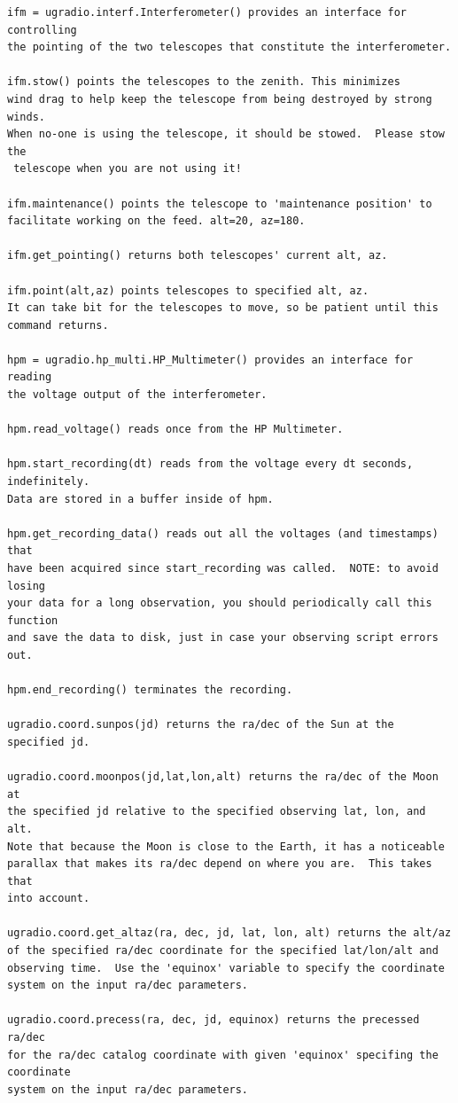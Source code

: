 \documentclass[11pt,preprint]{aastex}
\begin{document}
\begin{verbatim}
ifm = ugradio.interf.Interferometer() provides an interface for controlling 
the pointing of the two telescopes that constitute the interferometer.

ifm.stow() points the telescopes to the zenith. This minimizes 
wind drag to help keep the telescope from being destroyed by strong winds. 
When no-one is using the telescope, it should be stowed.  Please stow the
 telescope when you are not using it!

ifm.maintenance() points the telescope to 'maintenance position' to 
facilitate working on the feed. alt=20, az=180.

ifm.get_pointing() returns both telescopes' current alt, az.

ifm.point(alt,az) points telescopes to specified alt, az.
It can take bit for the telescopes to move, so be patient until this
command returns.

hpm = ugradio.hp_multi.HP_Multimeter() provides an interface for reading
the voltage output of the interferometer.

hpm.read_voltage() reads once from the HP Multimeter.

hpm.start_recording(dt) reads from the voltage every dt seconds, indefinitely.
Data are stored in a buffer inside of hpm.

hpm.get_recording_data() reads out all the voltages (and timestamps) that
have been acquired since start_recording was called.  NOTE: to avoid losing
your data for a long observation, you should periodically call this function
and save the data to disk, just in case your observing script errors out.

hpm.end_recording() terminates the recording.  

ugradio.coord.sunpos(jd) returns the ra/dec of the Sun at the specified jd.

ugradio.coord.moonpos(jd,lat,lon,alt) returns the ra/dec of the Moon at
the specified jd relative to the specified observing lat, lon, and alt.
Note that because the Moon is close to the Earth, it has a noticeable
parallax that makes its ra/dec depend on where you are.  This takes that
into account.

ugradio.coord.get_altaz(ra, dec, jd, lat, lon, alt) returns the alt/az
of the specified ra/dec coordinate for the specified lat/lon/alt and
observing time.  Use the 'equinox' variable to specify the coordinate
system on the input ra/dec parameters.

ugradio.coord.precess(ra, dec, jd, equinox) returns the precessed ra/dec
for the ra/dec catalog coordinate with given 'equinox' specifing the coordinate
system on the input ra/dec parameters.

\end{verbatim}
\end{document}
